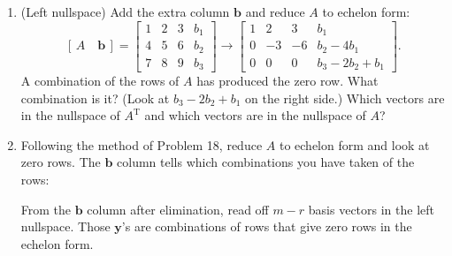 \documentclass[14pt, a4paper]{article}
\begin{document}
\begin{enumerate}
    \item (Left nullspace) Add the extra column $\boldsymbol{b}$ and reduce $A$ to echelon form:
          \[
              [\,A \quad \boldsymbol{b}\,] = \begin{bmatrix} 1 & 2 & 3 & b_1 \\ 4 & 5 & 6 & b_2 \\ 7 & 8 & 9 & b_3 \end{bmatrix} \to
              \begin{bmatrix} 1 & 2 & 3 & b_1 \\ 0 & -3 & -6 & b_2 - 4b_1 \\ 0 & 0 & 0 & b_3 - 2b_2 + b_1 \end{bmatrix}.
          \]
          A combination of the rows of $A$ has produced the zero row. What combination is it? (Look at $b_3 - 2b_2 + b_1$ on the right side.) Which vectors are in the nullspace of $A^{\mathrm{T}}$ and which vectors are in the nullspace of $A$?

    \item Following the method of Problem 18, reduce $A$ to echelon form and look at zero rows. The $\boldsymbol{b}$ column tells which combinations you have taken of the rows:
          \begin{enumerate}
          \end{enumerate}
          From the $\boldsymbol{b}$ column after elimination, read off $m-r$ basis vectors in the left nullspace. Those $\boldsymbol{y}$'s are combinations of rows that give zero rows in the echelon form.


\end{enumerate}
\end{document}
